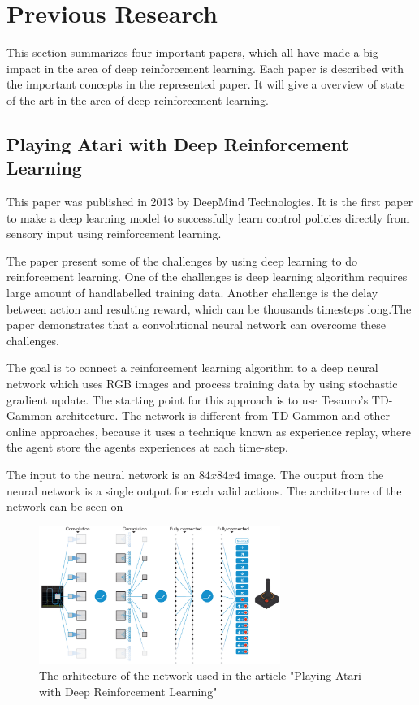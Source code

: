 \section{Previous Research}
\label{Previous_Research}
This section summarizes four important papers, which all have made a big impact in the area of deep reinforcement learning. Each paper is described with the important concepts in the represented paper. It will give a overview of state of the art in the area of deep reinforcement learning.   

\subsection{Playing Atari with Deep Reinforcement Learning }\cite{DBLP:journals/corr/MnihKSGAWR13}
This paper was published in 2013 by DeepMind Technologies. It is the first paper to make a deep learning model to successfully learn control policies directly from sensory input using reinforcement learning. 

The paper present some of the challenges by using deep learning to do reinforcement learning. One of the challenges is deep learning algorithm requires large amount of handlabelled training data. Another challenge is the delay between action and resulting reward, which can be thousands timesteps long.The paper demonstrates that a convolutional neural network can overcome these challenges. 

The goal is to connect a reinforcement learning algorithm to a deep neural network which uses RGB images and process training data by using stochastic gradient update. The starting point for this approach is to use Tesauro's TD-Gammon \cite{Tesauro:1995:TDL:203330.203343} architecture. The network is different from TD-Gammon and other online approaches, because it uses a technique known as experience replay, where the agent store the agents experiences at each time-step.

The input to the neural network is an $84 x 84 x 4$ image. The output from the neural network is a single output for each valid actions. The architecture of the network can be seen on    
\begin{figure}[H]
	\centering
	\includegraphics[width=0.7\textwidth]{Figures/TheoreticalBackground/playing_atari.jpg}
	\caption{The arhitecture of the network used in the article "Playing Atari with Deep Reinforcement Learning"}
	\label{fig:playing_atari}
\end{figure} 

